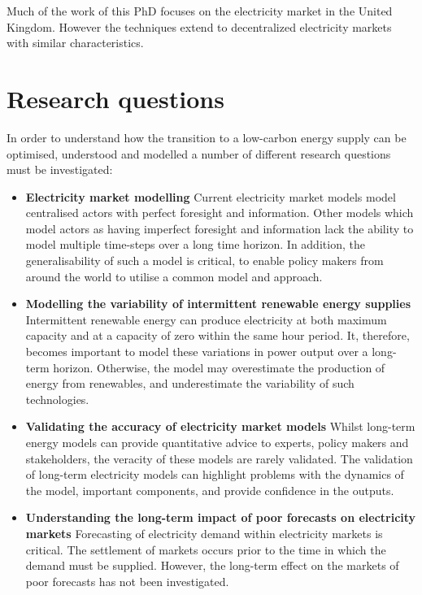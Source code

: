 Much of the work of this PhD focuses on the electricity market in the United Kingdom. However the techniques extend to  decentralized electricity markets with similar characteristics. 









\section{Research questions}


In order to understand how the transition to a low-carbon energy supply can be optimised, understood and modelled a number of different research questions must be investigated:

\begin{itemize}


	\item \textbf{Electricity market modelling} Current electricity market models model centralised actors with perfect foresight and information. Other models which model actors as having imperfect foresight and information lack the ability to model multiple time-steps over a long time horizon. In addition, the generalisability of such a model is critical, to enable policy makers from around the world to utilise a common model and approach.

	\item \textbf{Modelling the variability of intermittent renewable energy supplies} Intermittent renewable energy can produce electricity at both maximum capacity and at a capacity of zero within the same hour period. It, therefore, becomes important to model these variations in power output over a long-term horizon. Otherwise, the model may overestimate the production of energy from renewables, and underestimate the variability of such technologies.

	\item \textbf{Validating the accuracy of electricity market models} Whilst long-term energy models can provide quantitative advice to experts, policy makers and stakeholders, the veracity of these models are rarely validated. The validation of long-term electricity models can highlight problems with the dynamics of the model, important components, and provide confidence in the outputs. 


	\item \textbf{Understanding the long-term impact of poor forecasts on electricity markets} Forecasting of electricity demand within electricity markets is critical. The settlement of markets occurs prior to the time in which the demand must be supplied. However, the long-term effect on the markets of poor forecasts has not been investigated.


\end{itemize}
